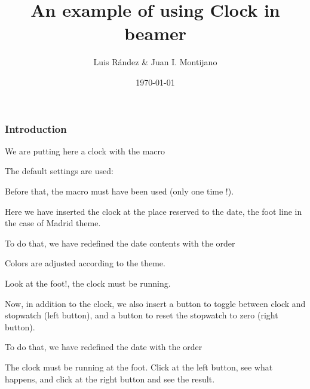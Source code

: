 \documentclass{beamer}
\title[A clock in beamer]{An example of using Clock in beamer}
\author{Luis R\'{a}ndez \& Juan I. Montijano}
\institute[IUMA]{IUMA \\ Universidad de Zaragoza }
\date{\today}
\begin{document}
\frame{\titlepage}



\begin{frame}[t]

\frametitle{Introduction}

\initclock  %

We are putting here a clock with the macro  \quad
{}

\medskip

The default settings are used:  \insertclock

\medskip

Before that, the macro \quad  {}
\quad must have been used (only one time !).

\end{frame}

%
\date{\insertclock}


\begin{frame}

Here we have inserted the clock at the place reserved to the date, the foot line in the case of Madrid theme.

\medskip

To do that, we have redefined the date contents with the order
\medskip

\centerline{ }

\medskip

Colors are adjusted according to the theme.

\medskip

Look at the foot!, the clock must be running.
\end{frame}

\date{\inserttogglebutton{}\insertclock\insertresetbutton{}}

\begin{frame}

Now, in addition to the clock, we also insert a button to toggle between clock and stopwatch (left button), and a button to reset the stopwatch to zero (right button).

\medskip

To do that, we have redefined the date with the order

\medskip


\medskip

The clock must be running at the foot. Click at the left button, see what happens,
and click at the right button and see the result.
\end{frame}
\end{document}
